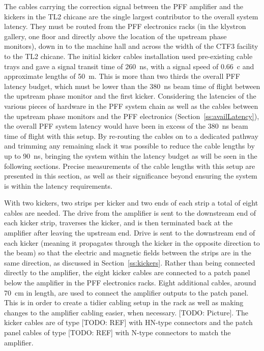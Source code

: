 The cables carrying the correction signal between the PFF amplifier and the kickers in the TL2 chicane are the single largest contributor to the overall system latency. They must be routed from the PFF electronics racks (in the klystron gallery, one floor and directly above the location of the upstream phase monitors), down in to the machine hall and across the width of the CTF3 facility to the TL2 chicane. The initial kicker cables installation used pre-existing cable trays and gave a signal transit time of 260~ns, with a signal speed of 0.66~c and approximate lengths of 50~m. This is more than two thirds the overall PFF latency budget, which must be lower than the 380~ns beam time of flight between the upstream phase monitor and the first kicker. Considering the latencies of the various pieces of hardware in the PFF system chain as well as the cables between the upstream phase monitors and the PFF electronics (Section~\ref{ss:availLatency}), the overall PFF system latency would have been in excess of the \(380\)~ns beam time of flight with this setup. By re-routing the cables on to a dedicated pathway and trimming any remaining slack it was possible to reduce the cable lengths by up to 90~ns, bringing the system within the latency budget as will be seen in the following sections. Precise measurements of the cable lengths with this setup are presented in this section, as well as their significance beyond ensuring the system is within the latency requirements.

With two kickers, two strips per kicker and two ends of each strip a total of eight cables are needed. The drive from the amplifier is sent to the downstream end of each kicker strip, traverses the kicker, and is then terminated back at the amplifier after leaving the upstream end. Drive is sent to the downstream end of each kicker (meaning it propagates through the kicker in the opposite direction to the beam) so that the electric and magnetic fields between the strips are in the same direction, as discussed in Section~\ref{ss:kickers}. Rather than being connected directly to the amplifier, the eight kicker cables are connected to a patch panel below the amplifier in the PFF electronics racks. Eight additional cables, around 70~cm in length, are used to connect the amplifier outputs to the patch panel. This is in order to create a tidier cabling setup in the rack as well as making changes to the amplifier cabling easier, when necessary. [TODO: Picture]. The kicker cables are of type [TODO: REF] with HN-type connectors and the patch panel cables of type [TODO: REF] with N-type connectors to match the amplifier.

